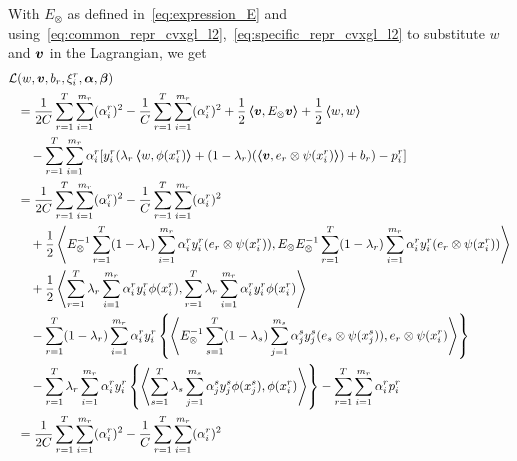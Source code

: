 With $E_\otimes$ as defined in~\eqref{eq:expression_E} and using~\eqref{eq:common_repr_cvxgl_l2},~\eqref{eq:specific_repr_cvxgl_l2} to substitute $w$ and $\bm{v}$ in the Lagrangian, we get
\begin{equation}\nonumber
    \begin{aligned}
            \mathcal{L}&({w}, \fv{v}, b_r, \xi_i^r, {\fv{\alpha}}, \fv{\beta}) \\
            &= \frac{1}{2C} \sum_{r=1}^\ntasks \sum_{i=1}^{\npertask_r} (\alpha_i^r)^2 - \frac{1}{C} \sum_{r=1}^\ntasks \sum_{i=1}^{\npertask_r} (\alpha_i^r)^2 + \frac{1}{2} \dotp{\fv{v}}{E_\otimes\fv{v}} + \frac{1}{2} \dotp{w}{w}
            \\ &\quad  - \sum_{r=1}^T \sum_{i=1}^{\npertask_r}{ \alpha_i^r [y_{i}^r (\lambda_r \dotp{w}{\phi(x_i^r)} + (1 - \lambda_r) (\dotp{\fv{v}}{e_r \otimes \psi({x}_i^r)}) + b_r) - p_{i}^r]   } \\
            &= \frac{1}{2C} \sum_{r=1}^\ntasks \sum_{i=1}^{\npertask_r} (\alpha_i^r)^2 - \frac{1}{C} \sum_{r=1}^\ntasks \sum_{i=1}^{\npertask_r} (\alpha_i^r)^2 \\
            &\quad + \frac{1}{2} \dotp{E_\otimes^{-1} \sum_{r=1}^\ntasks (1 - \lambda_r) \sum_{i=1}^{\npertask_r}{\alpha_i^r y_i^r (e_r \otimes \psi({x}_i^r))}}{E_\otimes E_\otimes^{-1} \sum_{r=1}^\ntasks (1 - \lambda_r) \sum_{i=1}^{\npertask_r}{\alpha_i^r y_i^r (e_r \otimes \psi({x}_i^r))}} \\ 
            &\quad  +\frac{1}{2} \dotp{\sum_{r=1}^\ntasks \lambda_r \sum_{i=1}^{\npertask_r}{\alpha_i^r y_i^r \phi(x_i^r)}}{\sum_{r=1}^\ntasks \lambda_r \sum_{i=1}^{\npertask_r}{\alpha_i^r y_i^r \phi(x_i^r)}} \\
            &\quad - \sum_{r=1}^T (1 - \lambda_r) \sum_{i=1}^{\npertask_r}{ \alpha_i^r y_{i}^r \left\lbrace  \dotp{E_\otimes^{-1} \sum_{s=1}^\ntasks (1 - \lambda_s) \sum_{j=1}^{\npertask_s}{\alpha_j^s y_j^s (e_s \otimes \psi({x}_j^s))}}{e_r \otimes \psi(x_i^r)} \right\rbrace   } \\
            &\quad - \sum_{r=1}^T \lambda_r \sum_{i=1}^{\npertask_r}{ \alpha_i^r y_{i}^r \left\lbrace  \dotp{\sum_{s=1}^\ntasks \lambda_s \sum_{j=1}^{\npertask_s}{\alpha_j^s y_j^s \phi(x_j^s)}}{\phi(x_i^r)} \right\rbrace   } - \sum_{r=1}^\ntasks \sum_{i=1}^{\npertask_r} \alpha_i^r p_i^r \\
            &= \frac{1}{2C} \sum_{r=1}^\ntasks \sum_{i=1}^{\npertask_r} (\alpha_i^r)^2 - \frac{1}{C} \sum_{r=1}^\ntasks \sum_{i=1}^{\npertask_r} (\alpha_i^r)^2 \\

\end{aligned}
\end{equation}
